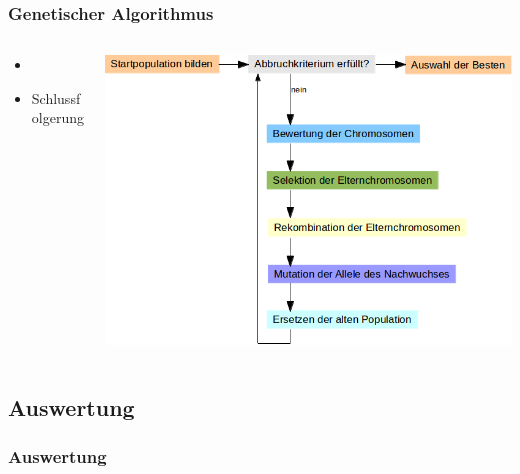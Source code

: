 \begin{frame}
  \frametitle{Genetischer Algorithmus}
  \begin{columns}[T]
    \begin{column}{0.35\textwidth}
      \begin{itemize}
      \item 
      \item Schlussfolgerung
      \end{itemize}
    \end{column}
    \begin{column}{0.65\textwidth}
        \includegraphics[width=\textwidth]{GenAlg-Diagramm.png}
    \end{column}
  \end{columns}
\end{frame}

\subsection{Auswertung}

\begin{frames}
  \frametitle{Auswertung}
  
\end{frames}
  
